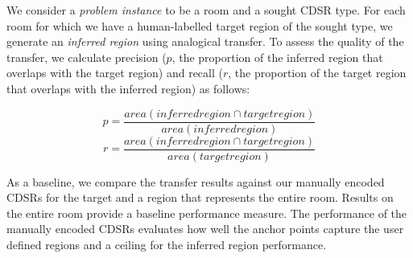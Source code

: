 We consider a \textit{problem instance} to be a room and a sought CDSR type. For each room for which we have a human-labelled target region of the sought type, we generate an \textit{inferred region} using analogical transfer. To assess the quality of the transfer, we calculate precision ($p$, the proportion of the inferred region that overlaps with the target region) and recall ($r$, the proportion of the target region that overlaps with the inferred region) as follows:

\begin{equation}
	p=\frac{area(inferred region \cap target region)}{area(inferred region)}
\end{equation}
\begin{equation}
	r=\frac{area(inferred region \cap target region)}{area(target region)}
\end{equation}


As a baseline, we compare the transfer results against our manually encoded CDSRs for the target and a region that represents the entire room. Results on the entire room provide a baseline performance measure. The performance of the manually encoded CDSRs evaluates how well the anchor points capture the user defined regions and a ceiling for the inferred region performance.









